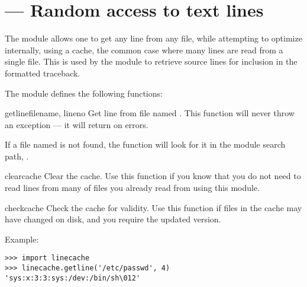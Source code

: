 \section{ ---
         Random access to text lines}



The  module allows one to get any line from any file,
while attempting to optimize internally, using a cache, the common case
where many lines are read from a single file.  This is used by the
 module to retrieve source lines for inclusion in 
the formatted traceback.

The  module defines the following functions:

\begin{funcdesc}{getline}{filename, lineno}
Get line  from file named . This function
will never throw an exception --- it will return  on errors.

If a file named  is not found, the function will look
for it in the module search path,
.
\end{funcdesc}

\begin{funcdesc}{clearcache}{}
Clear the cache.  Use this function if you know that you do not need
to read lines from many of files you already read from using this
module.
\end{funcdesc}

\begin{funcdesc}{checkcache}{}
Check the cache for validity.  Use this function if files in the cache 
may have changed on disk, and you require the updated version.
\end{funcdesc}

Example:

\begin{verbatim}
>>> import linecache
>>> linecache.getline('/etc/passwd', 4)
'sys:x:3:3:sys:/dev:/bin/sh\012'
\end{verbatim}
